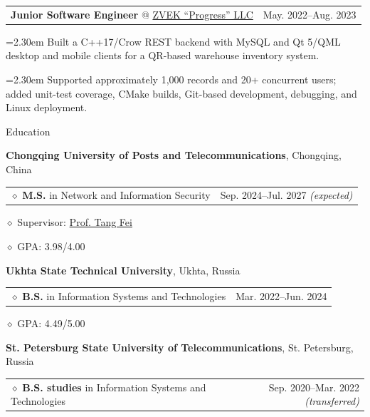 \documentclass[11pt,a4paper]{article}
\makeatletter
\newcommand{\cvrow}[2]{%
  \noindent
  \begin{minipage}[t]{0.145\textwidth}
    \vspace{0pt}%
    \raggedright
    \fontsize{10.5}{12.5}\selectfont
    #1
  \end{minipage}%
  \hfill
  \begin{minipage}[t]{0.835\textwidth}
    \vspace{0pt}%
    #2
  \end{minipage}\par
}
\newcommand{\eduentry}[2]{%
  \noindent
  \begin{tabularx}{\linewidth}
    {@{}X@{\hspace{0.8em}}r@{}}
    #1 & \small #2
  \end{tabularx}\par
  \vspace{0.15em}
}
\newcommand{\edudetail}[1]{%
  \noindent\hspace*{1.15em}$\diamond$ #1\par
}
\newcommand{\workentry}[2]{%
  \noindent
  \begin{tabularx}{\linewidth}
    {@{}X@{\hspace{0.8em}}r@{}}
    #1 & \small #2
  \end{tabularx}\par
  \vspace{0.15em}
}
\newcommand{\workproject}[1]{%
  \noindent
  \hangindent=2.30em
  \hangafter=1
  \hspace*{1.15em}\makebox[1.15em][l]{$\diamond$}#1\par
  \vspace{0.12em}
}
\makeatother
\begin{document}
\cvrow{}{%
  \workentry
    {\textbf{Junior Software Engineer} @
    \href{https://zvekprogress.ru/}{ZVEK ``Progress'' LLC}}
    {May. 2022--Aug. 2023}

  \workproject{Built a C++17/Crow REST backend with MySQL and Qt 5/QML desktop
  and mobile clients for a QR-based warehouse inventory system.}

  \workproject{Supported approximately 1,000 records and 20+ concurrent users;
  added unit-test coverage, CMake builds, Git-based development, debugging, and Linux deployment.}
}

\vspace{0.75em}

\cvrow{Education}{%
  \raggedright

  \textbf{Chongqing University of Posts and Telecommunications},
  Chongqing, China\par
  \vspace{0.12em}

  \eduentry
    {$\diamond$ \textbf{M.S.} in Network and Information Security}
    {Sep. 2024--Jul. 2027 \textit{(expected)}}

  \edudetail{Supervisor:
    \href{https://faculty.cqupt.edu.cn/tangfei/en/index.htm}{Prof. Tang Fei}}
  \edudetail{GPA: 3.98/4.00}

  \vspace{0.48em}

  \textbf{Ukhta State Technical University},
  Ukhta, Russia\par
  \vspace{0.12em}

  \eduentry
    {$\diamond$ \textbf{B.S.} in Information Systems and Technologies}
    {Mar. 2022--Jun. 2024}

  \edudetail{GPA: 4.49/5.00}

  \vspace{0.48em}

  \textbf{St. Petersburg State University of Telecommunications},
  St. Petersburg, Russia\par
  \vspace{0.12em}

  \eduentry
    {$\diamond$ \textbf{B.S. studies} in Information Systems and Technologies}
    {Sep. 2020--Mar. 2022 \textit{(transferred)}}
}

\vspace{0.75em}
\end{document}

